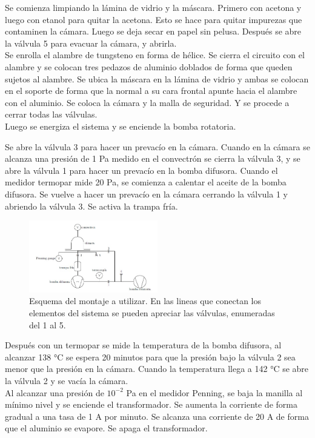 \documentclass[journal]{IEEEtran}
\begin{document}
Se comienza limpiando la lámina de vidrio y la máscara. Primero con acetona y luego con etanol para quitar la acetona. Esto se hace para quitar impurezas que contaminen la cámara. Luego se deja secar en papel sin pelusa. Después se abre la válvula 5 para evacuar la cámara, y abrirla. \\ 

Se enrolla el alambre de tungsteno en forma de hélice. Se cierra el circuito con el alambre y se colocan tres pedazos de aluminio doblados de forma que queden sujetos al alambre.
Se ubica la máscara en la lámina de vidrio y ambas se colocan en el soporte de forma que la normal a su cara frontal apunte hacia el alambre con el aluminio. 
Se coloca la cámara y la malla de seguridad. Y se procede a cerrar todas las válvulas.\\

Luego se energiza el sistema y se enciende la bomba rotatoria. 

Se abre la válvula 3 para hacer un prevacío en la cámara.
Cuando en la cámara se alcanza una presión de 1 Pa medido en el convectrón se cierra la válvula 3, y se abre la válvula 1 para hacer un prevacío en la bomba difusora.
Cuando el medidor termopar mide 20 Pa, se comienza a calentar el aceite de la bomba difusora. Se vuelve a hacer un prevacío en la cámara cerrando la válvula 1 y abriendo la válvula 3.
Se activa la trampa fría. 
\begin{figure}[H]
    \centering
    \includegraphics[width=0.5\textwidth]{Imagenes/p40.jpg}
    \caption{Esquema del montaje a utilizar. En las lineas que conectan los elementos del sistema se pueden apreciar las válvulas, enumeradas del 1 al 5.}
    \label{figura montaje}
\end{figure}

Después con un termopar se mide la temperatura de la bomba difusora, al alcanzar 138 °C se espera 20 minutos para que la presión bajo la válvula 2 sea menor que la presión en la cámara.
Cuando la temperatura llega a 142 °C se abre la válvula 2 y se vacía la cámara. \\

Al alcanzar una presión de $10^{-2}$ Pa en el medidor Penning, se baja la manilla al mínimo nivel y se enciende el transformador.
Se aumenta la corriente de forma gradual a una tasa de 1 A por minuto. Se alcanza una corriente de 20 A de forma que el aluminio se evapore. Se apaga el transformador. \\
\end{document}
